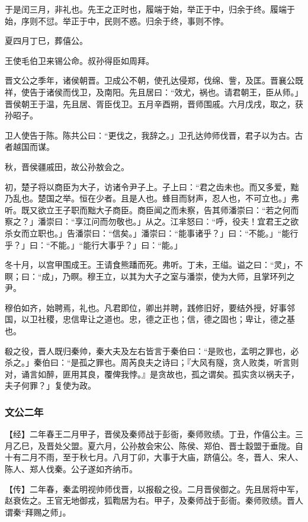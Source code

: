 \documentclass[]{article}
\begin{document}
于是闰三月，非礼也。先王之正时也，履端于始，举正于中，归余于终。履端于始，序则不愆。举正于中，民则不惑。归余于终，事则不悖。

夏四月丁巳，葬僖公。

王使毛伯卫来锡公命。叔孙得臣如周拜。

晋文公之季年，诸侯朝晋。卫成公不朝，使孔达侵郑，伐绵、訾，及匡。晋襄公既祥，使告于诸侯而伐卫，及南阳。先且居曰：``效尤，祸也。请君朝王，臣从师。」晋侯朝王于温，先且居、胥臣伐卫。五月辛酉朔，晋师围戚。六月戊戌，取之，获孙昭子。

卫人使告于陈。陈共公曰：``更伐之，我辞之。」卫孔达帅师伐晋，君子以为古。古者越国而谋。

秋，晋侯疆戚田，故公孙敖会之。

初，楚子将以商臣为大子，访诸令尹子上。子上曰：``君之齿未也。而又多爱，黜乃乱也。楚国之举。恒在少者。且是人也。蜂目而豺声，忍人也，不可立也。」弗听。既又欲立王子职而黜大子商臣。商臣闻之而未察，告其师潘崇曰：``若之何而察之？」潘崇曰：``享江问而勿敬也。」从之。江芈怒曰：``呼，役夫！宜君王之欲杀女而立职也。」告潘崇曰：``信矣。」潘崇曰：``能事诸乎？」曰：``不能。」``能行乎？」曰：``不能。」``能行大事乎？」曰：``能。」

冬十月，以宫甲围成王。王请食熊蹯而死。弗听。丁未，王缢。谥之曰：``灵」，不瞑；曰：``成」，乃瞑。穆王立，以其为大子之室与潘崇，使为大师，且掌环列之尹。

穆伯如齐，始聘焉，礼也。凡君即位，卿出并聘，践修旧好，要结外授，好事邻国，以卫社稷，忠信卑让之道也。忠，德之正也；信，德之固也；卑让，德之基也。

殽之役，晋人既归秦帅，秦大夫及左右皆言于秦伯曰：``是败也，孟明之罪也，必杀之。」秦伯曰：``是孤之罪也。周芮良夫之诗曰；『大风有隧，贪人败类，听言则对，诵言如醉，匪用其良，覆俾我悖。』是贪故也，孤之谓矣。孤实贪以祸夫子，夫子何罪？」复使为政。

\hypertarget{header-n1063}{%
\subsubsection{文公二年}\label{header-n1063}}

【经】二年春王二月甲子，晋侯及秦师战于彭衙，秦师败绩。丁丑，作僖公主。三月乙巳，及晋处父盟。夏六月，公孙敖会宋公、陈侯、郑伯、晋士縠盟于垂陇。自十有二月不雨，至于秋七月。八月丁卯，大事于大庙，跻僖公。冬，晋人、宋人、陈人、郑人伐秦。公子遂如齐纳币。

【传】二年春，秦孟明视帅师伐晋，以报殽之役。二月晋侯御之。先且居将中军，赵衰佐之。王官无地御戎，狐鞫居为右。甲子，及秦师战于彭衙。秦师败绩。晋人谓秦``拜赐之师」。
\end{document}
